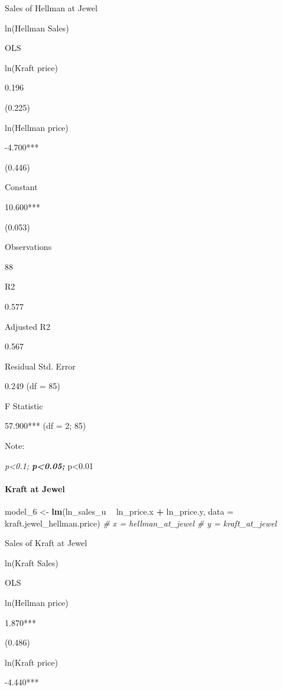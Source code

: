 \documentclass[]{article}
\newenvironment{Shaded}{\begin{snugshade}}{\end{snugshade}}
\newcommand{\CommentTok}[1]{\textcolor[rgb]{0.56,0.35,0.01}{\textit{#1}}}
\newcommand{\DataTypeTok}[1]{\textcolor[rgb]{0.13,0.29,0.53}{#1}}
\newcommand{\DecValTok}[1]{\textcolor[rgb]{0.00,0.00,0.81}{#1}}
\newcommand{\KeywordTok}[1]{\textcolor[rgb]{0.13,0.29,0.53}{\textbf{#1}}}
\newcommand{\NormalTok}[1]{#1}
\newcommand{\OperatorTok}[1]{\textcolor[rgb]{0.81,0.36,0.00}{\textbf{#1}}}
\newcommand{\StringTok}[1]{\textcolor[rgb]{0.31,0.60,0.02}{#1}}
\let\oldparagraph\paragraph
\renewcommand{\paragraph}[1]{\oldparagraph{#1}\mbox{}}
\begin{document}
Sales of Hellman at Jewel

ln(Hellman Sales)

OLS

ln(Kraft price)

0.196

(0.225)

ln(Hellman price)

-4.700***

(0.446)

Constant

10.600***

(0.053)

Observations

88

R2

0.577

Adjusted R2

0.567

Residual Std. Error

0.249 (df = 85)

F Statistic

57.900*** (df = 2; 85)

Note:

\emph{p\textless{}0.1; \textbf{p\textless{}0.05; }}p\textless{}0.01

\hypertarget{kraft-at-jewel-2}{%
\paragraph{Kraft at Jewel}\label{kraft-at-jewel-2}}

\begin{Shaded}
\begin{Highlighting}[]
\NormalTok{model_}\DecValTok{6}\NormalTok{ <-}\StringTok{ }\KeywordTok{lm}\NormalTok{(ln_sales_u }\OperatorTok{~}\StringTok{ }\NormalTok{ln_price.x }\OperatorTok{+}\StringTok{ }\NormalTok{ln_price.y, }\DataTypeTok{data =}\NormalTok{ kraft.jewel_hellman.price)}
\CommentTok{# x = hellman_at_jewel}
\CommentTok{# y = kraft_at_jewel}
\end{Highlighting}
\end{Shaded}

Sales of Kraft at Jewel

ln(Kraft Sales)

OLS

ln(Hellman price)

1.870***

(0.486)

ln(Kraft price)

-4.440***
\end{document}

